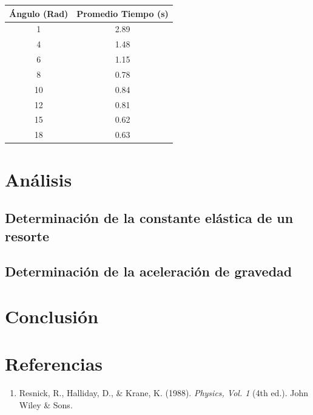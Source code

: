 \documentclass{article}
\begin{document}
\begin{multicols}{2}
    \begin{center}
        \begin{tabular}{|c|c|}
            \hline
            Ángulo (Rad) & Promedio Tiempo (s) \\
            \hline
            1 & 2.89 \\
            4 & 1.48 \\
            6 & 1.15 \\
            8 & 0.78 \\
            10 & 0.84 \\
            12 & 0.81 \\
            15 & 0.62 \\
            18 & 0.63 \\
            \hline
        \end{tabular}
    \end{center}

\section{Análisis}

    \subsection{Determinación de la constante elástica de un resorte}



    \subsection{Determinación de la aceleración de gravedad}

    

\section{Conclusión}

\section{Referencias}
    \begin{enumerate}
    
        \item \label{1} Resnick, R., Halliday, D., \& Krane, K. (1988). \textit{Physics, Vol. 1} (4th ed.). John Wiley \& Sons. 
    
    \end{enumerate}
\end{multicols}
\end{document}
